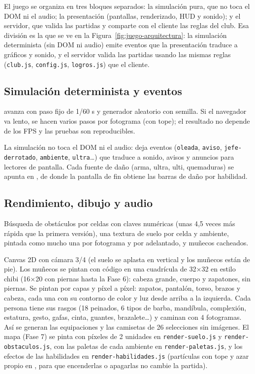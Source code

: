 El juego se organiza en tres bloques separados: la simulación pura, que no toca el DOM ni el audio; la presentación (pantallas, renderizado, HUD y sonido); y el servidor, que valida las partidas y comparte con el cliente las reglas del club. Esa división es la que se ve en la Figura~\ref{fig:juego-arquitectura}: la simulación determinista (sin DOM ni audio) emite eventos que la presentación traduce a gráficos y sonido, y el servidor valida las partidas usando las mismas reglas (\texttt{club.js}, \texttt{config.js}, \texttt{logros.js}) que el cliente.

\subsection{Simulación determinista y eventos}
 avanza con paso fijo de 1/60 s y generador aleatorio con semilla. Si el navegador va lento, se hacen varios pasos por fotograma (con tope); el resultado no depende de los FPS y las pruebas son reproducibles.

La simulación no toca el DOM ni el audio: deja eventos (\texttt{oleada}, \texttt{aviso}, \texttt{jefe-derrotado}, \texttt{ambiente}, \texttt{ultra}…) que  traduce a sonido, avisos y anuncios para lectores de pantalla. Cada fuente de daño (arma, ultra, ulti, quemaduras) se apunta en , de donde la pantalla de fin obtiene las barras de daño por habilidad.

\subsection{Rendimiento, dibujo y audio}
Búsqueda de obstáculos por celdas con claves numéricas (unas 4,5 veces más rápida que la primera versión), una textura de suelo por celda y ambiente, pintada como mucho una por fotograma y por adelantado, y muñecos cacheados.

Canvas 2D con cámara 3/4 (el suelo se aplasta en vertical y los muñecos están de pie). Los muñecos se pintan con código en una cuadrícula de 32×32 en estilo chibi (16×20 con piernas hasta la Fase 6): cabeza grande, cuerpo y zapatones, sin piernas. Se pintan por capas y píxel a píxel: zapatos, pantalón, torso, brazos y cabeza, cada una con su contorno de color y luz desde arriba a la izquierda. Cada persona tiene sus rasgos (18 peinados, 6 tipos de barba, mandíbula, complexión, estatura, gesto, gafas, cinta, guantes, brazalete…) y caminan con 4 fotogramas. Así se generan las equipaciones y las camisetas de 26 selecciones sin imágenes. El mapa (Fase 7) se pinta con píxeles de 2 unidades en \texttt{render-\allowbreak suelo.js} y \texttt{render-\allowbreak obstaculos.js}, con las paletas de cada ambiente en \texttt{render-\allowbreak paletas.js}, y los efectos de las habilidades en \texttt{render-\allowbreak habilidades.js} (partículas con tope y azar propio en , para que encenderlas o apagarlas no cambie la partida).

